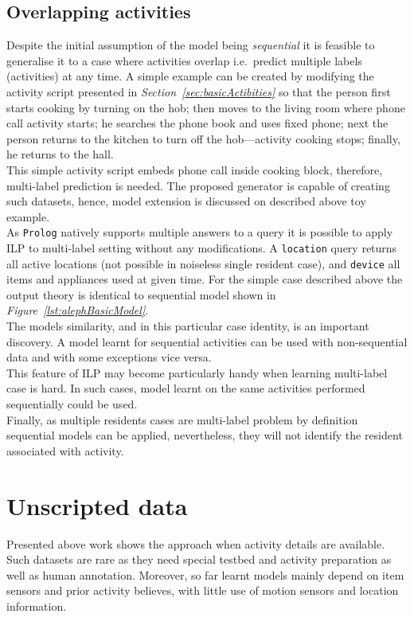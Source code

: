 \documentclass[10pt, a4paper, pdflatex, leqno, twoside, openright]{report}
\begin{document}
    \subsection{Overlapping activities\label{sec:singleML}}
Despite the initial assumption of the model being \emph{sequential} it is feasible to generalise it to a case where activities overlap i.e.\ predict multiple labels (activities) at any time. A simple example can be created by modifying the activity script presented in \emph{Section~\ref{sec:basicActibities}} so that the person first starts cooking by turning on the hob; then moves to the living room where phone call activity starts; he searches the phone book and uses fixed phone; next the person returns to the kitchen to turn off the hob---activity cooking stops; finally, he returns to the hall.\\
This simple activity script embeds phone call inside cooking block, therefore, multi-label prediction is needed. The proposed generator is capable of creating such datasets, hence, model extension is discussed on described above toy example.\\

As \texttt{Prolog} natively supports multiple answers to a query it is possible to apply ILP to multi-label setting without any modifications. A \texttt{location} query returns all active locations (not possible in noiseless single resident case), and \texttt{device} all items and appliances used at given time. For the simple case described above the output theory is identical to sequential model shown in \emph{Figure~\ref{lst:alephBasicModel}}.\\

The models similarity, and in this particular case identity, is an important discovery. A model learnt for sequential activities can be used with non-sequential data and with some exceptions vice versa.\\
This feature of ILP may become particularly handy when learning multi-label case is hard. In such cases, model learnt on the same activities performed sequentially could be used.\\
Finally, as multiple residents cases are multi-label problem by definition sequential models can be applied, nevertheless, they will not identify the resident associated with activity.

  \section{Unscripted data}
Presented above work shows the approach when activity details are available. Such datasets are rare as they need special testbed and activity preparation as well as human annotation. Moreover, so far learnt models mainly depend on item sensors and prior activity believes, with little use of motion sensors and location information.\\
\end{document}
